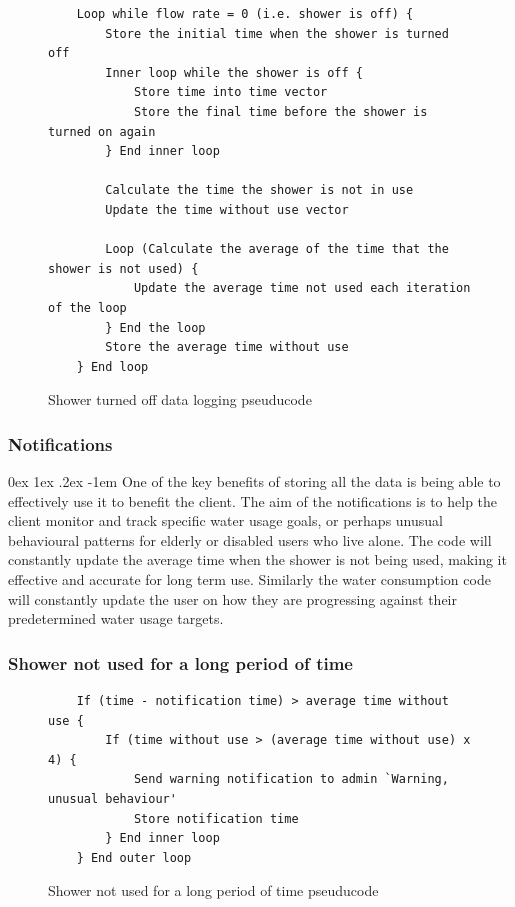 \documentclass[12pt, a4paper]{article}
\makeatletter
\renewcommand\paragraph{\@startsection{paragraph}{5}{\parindent}%
  {0ex \@plus1ex \@minus.2ex}%
  {-1em}%
  {\normalfont\normalsize\bfseries}}
\makeatother
\begin{document}
                \begin{figure}[H]
                    \begin{lstlisting}
    Loop while flow rate = 0 (i.e. shower is off) {
        Store the initial time when the shower is turned off
        Inner loop while the shower is off {
            Store time into time vector
            Store the final time before the shower is turned on again
        } End inner loop
                        
        Calculate the time the shower is not in use
        Update the time without use vector
                        
        Loop (Calculate the average of the time that the shower is not used) {
            Update the average time not used each iteration of the loop
        } End the loop
        Store the average time without use
    } End loop
                    \end{lstlisting}
                    \caption{Shower turned off data logging pseuducode}
                \end{figure}
            \normalsize
            \subsubsection{Notifications}
                \paragraph{}
                    One of the key benefits of storing all the data is being able to effectively use it to benefit the client. The aim of the notifications is to 
                    help the client monitor and track specific water usage goals, or perhaps unusual behavioural patterns for elderly or disabled users who live 
                    alone. The code will constantly update the average time when the shower is not being used, making it effective and accurate for long term use. 
                    Similarly the water consumption code will constantly update the user on how they are progressing against their predetermined water usage targets.
            \subsubsection{Shower not used for a long period of time}
                \footnotesize
                \begin{figure}[H]
                    \begin{lstlisting}
    If (time - notification time) > average time without use {
        If (time without use > (average time without use) x 4) {
            Send warning notification to admin `Warning, unusual behaviour'
            Store notification time
        } End inner loop
    } End outer loop
                    \end{lstlisting}
                    \caption{Shower not used for a long period of time pseuducode}
                \end{figure}
                \normalsize
\end{document}
